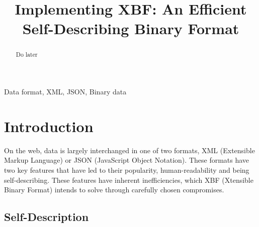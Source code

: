 \documentclass[conference]{IEEEtran}
\begin{document}
\title{Implementing XBF: An Efficient Self-Describing Binary Format}

\author{
	\and
}

\maketitle

\begin{abstract}
	Do later
\end{abstract}

\begin{IEEEkeywords}
	Data format, XML, JSON, Binary data
\end{IEEEkeywords}

\section{Introduction}

On the web, data is largely interchanged in one of two formats, XML (Extensible Markup Language)\cite{xml_spec} or JSON (JavaScript Object Notation)\cite{json_spec}. These formats have two key features that have led to their popularity, human-readability and being self-describing. These features have inherent inefficiencies, which XBF (Xtensible Binary Format)\cite{xbf_spec} intends to solve through carefully chosen compromises.

\subsection{Self-Description}
\end{document}
